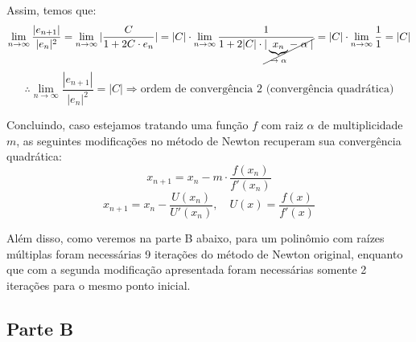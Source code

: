 \documentclass[12pt,a4paper,final]{article}
\begin{document}
Assim, temos que:
\[ \lim_{n \to \infty} \frac{|e_{n+1}|}{|e_n|^2} = \lim_{n \to \infty} |\frac{C}{1 + 2C \cdot e_n}| 
   = |C| \cdot \lim_{n \to \infty} \frac{1}{1 + 2|C| \cdot 
   \cancel{|\underbrace{x_n}_{\to \; \alpha}- \; \alpha \;|}} = |C| \cdot \lim_{n \to \infty} \frac{1}{1} 
   = |C| \]
\[ \therefore \lim_{n \to \infty} \frac{|e_{n+1}|}{|e_n|^2} = |C| \Rightarrow 
   \text{ordem de convergência 2 (convergência quadrática)} \]

Concluindo, caso estejamos tratando uma função $ f $ com raiz $ \alpha $ de multiplicidade $ m $, as
seguintes modificações no método de Newton recuperam sua convergência quadrática:
\[ x_{n+1} = x_n - m \cdot \frac{f(x_n)}{f'(x_n)} \]
\[ x_{n+1} = x_n - \frac{U(x_n)}{U'(x_n)} ,  \quad U(x) = \frac{f(x)}{f'(x)} \]

Além disso, como veremos na parte B abaixo, para um polinômio com raízes múltiplas
foram necessárias 9 iterações do método de Newton original, enquanto que com a segunda modificação
apresentada foram necessárias somente 2 iterações para o mesmo ponto inicial.


\subsection{Parte B}
\end{document}
